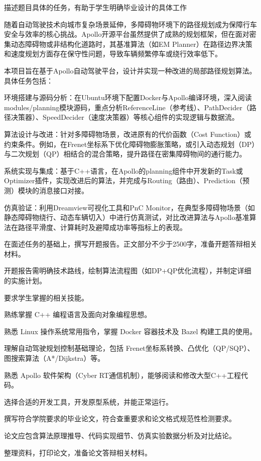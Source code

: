 \documentclass[a4paper,12pt]{article}
\begin{document}
描述题目具体的任务，有助于学生明确毕业设计的具体工作

随着自动驾驶技术向城市复杂场景延伸，多障碍物环境下的路径规划成为保障行车安全与效率的核心挑战。Apollo开源平台虽然提供了成熟的规划框架，但在面对密集动态障碍物或非结构化道路时，其基准算法（如EM Planner）在路径边界决策和速度规划方面存在保守性问题，导致车辆频繁停车或绕行效率低下。

本项目旨在基于Apollo自动驾驶平台，设计并实现一种改进的局部路径规划算法。具体任务包括：

环境搭建与源码分析：在Ubuntu环境下配置Docker与Apollo编译环境，深入阅读modules/planning模块源码，重点分析ReferenceLine（参考线）、PathDecider（路径决策器）、SpeedDecider（速度决策器）等核心组件的实现逻辑与数据流。

算法设计与改进：针对多障碍物场景，改进原有的代价函数（Cost Function）或约束条件。例如，在Frenet坐标系下优化障碍物膨胀策略，或引入动态规划（DP）与二次规划（QP）相结合的混合策略，提升路径在密集障碍物间的通行能力。

系统实现与集成：基于C++语言，在Apollo的planning组件中开发新的Task或Optimizer插件，实现改进后的算法，并完成与Routing（路由）、Prediction（预测）模块的消息接口对接。

仿真验证：利用Dreamview可视化工具和PnC Monitor，在典型多障碍物场景（如静态障碍物绕行、动态车辆切入）中进行仿真测试，对比改进算法与Apollo基准算法在路径平滑度、计算耗时及避障成功率等指标上的表现。

在面述任务的基础上，撰写开题报告。正文部分不少于2500字，准备开题答辩相关材料。

开题报告需明确技术路线，绘制算法流程图（如DP+QP优化流程），并制定详细的实施计划。

要求学生掌握的相关技能。

熟练掌握 C++ 编程语言及面向对象编程思想。

熟悉 Linux 操作系统常用指令，掌握 Docker 容器技术及 Bazel 构建工具的使用。

理解自动驾驶规划控制基础理论，包括 Frenet坐标系转换、凸优化（QP/SQP）、图搜索算法（A*/Dijkstra）等。

熟悉 Apollo 软件架构（Cyber RT通信机制），能够阅读和修改大型C++工程代码。

选择合适的开发工具，开发原型系统，并能正常运行。

撰写符合学院要求的毕业论文，符合查重要求和论文格式规范性检测要求。

论文应包含算法原理推导、代码实现细节、仿真实验数据分析及对比结论。

整理资料，打印论文，准备论文答辩相关材料。
\end{document}
